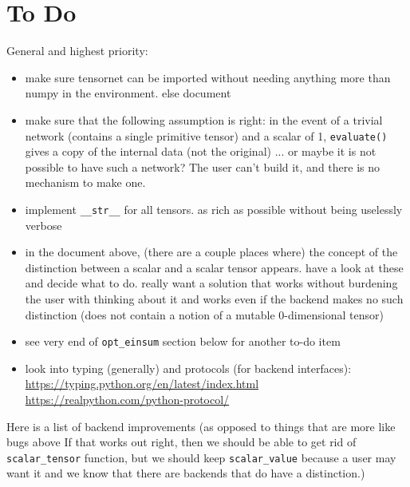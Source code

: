 \documentclass[12pt,letterpaper]{article}
\begin{document}
		\section{To Do}

General and highest priority:

\begin{itemize}
\item{
make sure tensornet can be imported without needing anything more than numpy in the environment. else document
}
\item{
make sure that the following assumption is right: in the event of a trivial network (contains a single primitive tensor)
and a scalar of 1, \texttt{evaluate()} gives a copy of the internal data (not the original) ... or maybe it is not possible
to have such a network?  The user can't build it, and there is no mechanism to make one.
}
\item{
implement \texttt{\_\_str\_\_} for all tensors.  as rich as possible without being uselessly verbose
}
\item{
in the document above, (there are a couple places where) the concept of the distinction between a scalar and
a scalar tensor appears.  have a look at these and decide what to do.  really want a solution that works
without burdening the user with thinking about it and works even if the backend makes no such distinction
(does not contain a notion of a mutable 0-dimensional tensor)
}
\item{
see very end of \texttt{opt\_einsum} section below for another to-do item
}
\item{
look into typing (generally) and protocols (for backend interfaces):
\url{https://typing.python.org/en/latest/index.html}
\url{https://realpython.com/python-protocol/}
}
\end{itemize}

\noindent
Here is a list of backend improvements (as opposed to things that are more like bugs above
If that works out right, then we should be able to get rid of \texttt{scalar\_tensor} function, but we should
keep \texttt{scalar\_value} because a user may want it and we know that there are backends that do have a distinction.)
\end{document}
